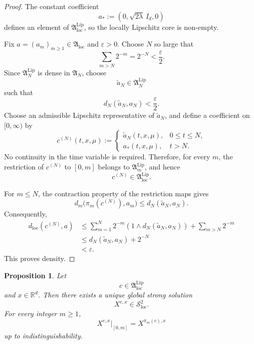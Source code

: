 \documentclass[12pt,oneside, reqno]{amsart}
\newtheorem{proposition}[theorem]{Proposition}
\numberwithin{equation}{section}
\begin{document}
	\begin{proof}
		The constant coefficient
		\[
		a_\ast:=(0,\sqrt{2\lambda}\,I_d,0)
		\]
		defines an element of
		\(\mathfrak A_{\mathrm{loc}}^{\mathrm{Lip}}\), so the locally
		Lipschitz core is non-empty.
		
		Fix \(a=(a_m)_{m\geq1}\in\mathfrak A_{\mathrm{loc}}\) and
		\(\varepsilon>0\). Choose \(N\) so large that
		\[
		\sum_{m>N}2^{-m}=2^{-N}<\frac{\varepsilon}{2}.
		\]
		Since \(\mathfrak A_N^{\mathrm{Lip}}\) is dense in
		\(\mathfrak A_N\), choose
		\[
		\widetilde a_N\in\mathfrak A_N^{\mathrm{Lip}}
		\]
		such that
		\[
		d_N(\widetilde a_N,a_N)<\frac{\varepsilon}{2}.
		\]
		Choose an admissible Lipschitz representative of \(\widetilde a_N\), and define
		a coefficient on \([0,\infty)\) by
		\[
		c^{(N)}(t,x,\mu)
		:=
		\begin{cases}
			\widetilde a_N(t,x,\mu),&0\leq t\leq N,\\
			a_\ast(t,x,\mu),&t>N.
		\end{cases}
		\]
		No continuity in the time variable is required. Therefore, for every
		\(m\), the restriction of \(c^{(N)}\) to \([0,m]\) belongs to
		\(\mathfrak A_m^{\mathrm{Lip}}\), and hence
		\[
		c^{(N)}\in\mathfrak A_{\mathrm{loc}}^{\mathrm{Lip}}.
		\]
		
		For \(m\leq N\), the contraction property of the restriction maps
		gives
		\[
		d_m\bigl(\pi_m(c^{(N)}),a_m\bigr)
		\leq
		d_N(\widetilde a_N,a_N).
		\]
		Consequently,
		\[
		\begin{aligned}
			d_{\mathrm{loc}}(c^{(N)},a)
			&\leq
			\sum_{m=1}^{N}
			2^{-m}
			\left(
			1\wedge d_N(\widetilde a_N,a_N)
			\right)
			+
			\sum_{m>N}2^{-m}
			\\
			&\leq
			d_N(\widetilde a_N,a_N)+2^{-N}
			\\
			&<\varepsilon.
		\end{aligned}
		\]
		This proves density.
	\end{proof}
	
	\begin{proposition}
		\label{prop:global-core-wellposedness}
		Let
		\[
		c\in\mathfrak A_{\mathrm{loc}}^{\mathrm{Lip}}
		\]
		and \(x\in\mathbb R^d\). Then there exists a unique global strong
		solution
		\[
		X^{c,x}\in\mathcal S_{\mathrm{loc}}^2.
		\]
		For every integer \(m\geq1\),
		\[
		X^{c,x}|_{[0,m]}
		=
		X^{\pi_m(c),x}
		\]
		up to indistinguishability.
	\end{proposition}
	
\end{document}
